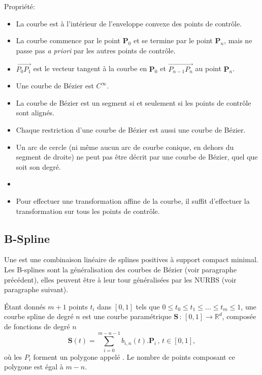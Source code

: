 \medskip
Propriété:
\begin{itemize}
   \item La courbe est à l'intérieur de l'enveloppe convexe des points de contrôle.
   \item La courbe commence par le point $\mathbf{P}_0$ et se termine par le point $\mathbf{P}_n$, 
	mais ne passe pas \emph{a priori} par les autres points de contrôle.
   \item $\overrightarrow{P_0P_1}$ est le vecteur tangent à la courbe en $\mathbf{P}_0$ et
	$\overrightarrow{P_{n-1}P_n}$ au point $\mathbf{P}_n$.
   \item Une courbe de Bézier est $C^{\infty}$.
   \item La courbe de Bézier est un segment si et seulement si les points de contrôle sont alignés.
   \item Chaque restriction d'une courbe de Bézier est aussi une courbe de Bézier.
   \item Un arc de cercle (ni même aucun arc de courbe conique, en dehors du segment de droite) ne peut pas 
	être décrit par une courbe de Bézier, quel que soit son degré.
   \item {}
   \item Pour effectuer une transformation affine de la courbe, il suffit d'effectuer la transformation sur tous 
	les points de contrôle.
\end{itemize}


\medskip
\subsection{B-Spline}

Une  est une combinaison linéaire de splines positives à support compact minimal. 
Les B-splines sont la généralisation des courbes de Bézier (voir paragraphe précédent), elles peuvent être 
à leur tour généralisées par les NURBS (voir paragraphe suivant).

\medskip
Étant donnés $m+1$ points $t_i$ dans $[0, 1]$ tels que $0 \le t_0 \le t_1 \le \ldots \le t_m \le 1$,
une courbe spline de degré $n$ est une courbe paramétrique $\mathbf{S} \,:\, [0,1] \to \mathbb{R}^d$,
composée de fonctions  de degré $n$
\begin{equation}
    \mathbf{S}(t) = \sum_{i = 0}^{m - n - 1} b_{i, n} (t) . \mathbf{P}_{i} \,,\, t \in [0, 1],
\end{equation}
où les $P_i$ forment un polygone appelé . 
Le nombre de points composant ce polygone est égal à $m-n$.


